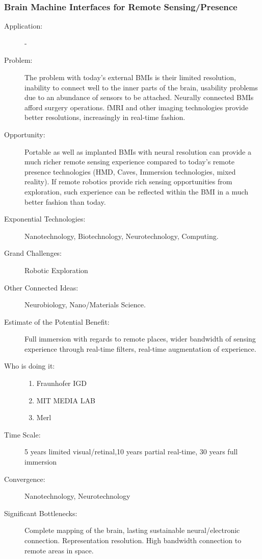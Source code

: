     \subsubsection{Brain Machine Interfaces for Remote  Sensing/Presence} 
\begin{description}  \item[Application:] -
  
   \item[Problem:] The problem with today's external \glspl{BMI} is their limited  resolution, inability to 
connect well to the inner parts  of the brain, usability problems due to an abundance of sensors 
to  be attached. Neurally connected \glspl{BMI} afford surgery operations. \Gls{fMRI} and other imaging 
technologies  provide better resolutions, increasingly in real-time fashion.
  
  \item[Opportunity:] Portable as  well as implanted \glspl{BMI} with neural resolution can provide a much 
richer remote sensing experience  compared to today’s remote presence technologies (HMD, 
Caves, Immersion technologies,  mixed reality). If remote robotics provide rich sensing 
opportunities from exploration,  such experience can be reflected within the \gls{BMI} in a much 
better fashion than today.
 
    \item[Exponential Technologies:]  Nanotechnology, Biotechnology,  Neurotechnology, Computing.
 
  \item[Grand Challenges:] Robotic  Exploration 
 
   \item[Other Connected Ideas:] Neurobiology, Nano/Materials Science.
 
 \item[Estimate  of the Potential Benefit:] Full immersion with regards to remote  places, wider 
bandwidth of sensing experience  through real-time filters, real-time augmentation of experience.
 
   \item[Who is doing it:]
  \hfill\begin{enumerate}
    \item Fraunhofer IGD
     \item MIT MEDIA LAB
     \item Merl
     \end{enumerate}
 
   \item[Time Scale:] 5 years limited visual/retinal,10 years partial  real-time, 30 years full immersion
 
   \item[Convergence:]  Nanotechnology, Neurotechnology
 
   \item[Significant Bottlenecks:]
Complete mapping of the brain,  lasting sustainable neural/electronic connection. Representation 
resolution. High bandwidth  connection to remote areas in space.
    \end{description}
 
